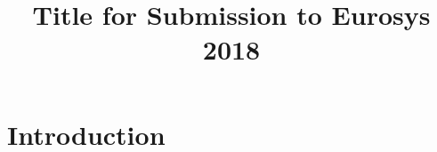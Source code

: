 \documentclass[10pt,preprint]{sigplanconf-eurosys}
\date{}
\begin{document}
\title{Title for Submission to Eurosys 2018} 
\maketitle

\begin{abstract}



\end{abstract}

\section{Introduction}





% 
\end{document}
